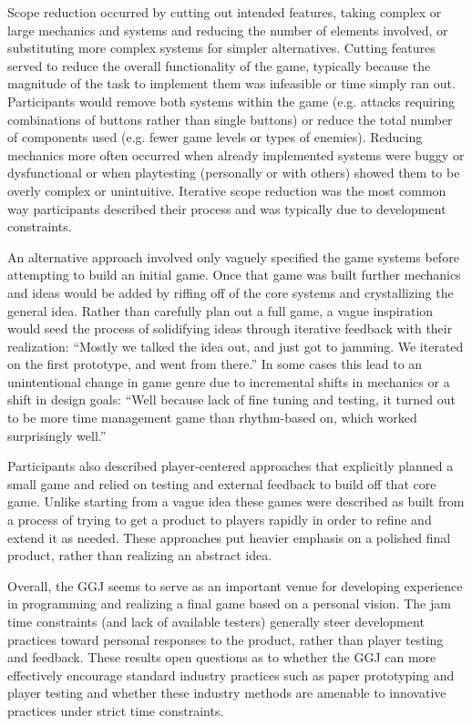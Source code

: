 \documentclass{sig-alternate}
\begin{document}
Scope reduction occurred by cutting out intended features, taking complex or large mechanics and systems and reducing the number of elements involved, or substituting more complex systems for simpler alternatives.
Cutting features served to reduce the overall functionality of the game, typically because the magnitude of the task to implement them was infeasible or time simply ran out. Participants would remove both systems within the game (e.g. attacks requiring combinations of buttons rather than single buttons) or reduce the total number of components used (e.g. fewer game levels or types of enemies).
Reducing mechanics more often occurred when already implemented systems were buggy or dysfunctional or when playtesting (personally or with others) showed them to be overly complex or unintuitive. 
Iterative scope reduction was the most common way participants described their process and was typically due to development constraints.

An alternative approach involved only vaguely specified the game systems before attempting to build an initial game. Once that game was built further mechanics and ideas would be added by riffing off of the core systems and crystallizing the general idea.
Rather than carefully plan out a full game, a vague inspiration would seed the process of solidifying ideas through iterative feedback with their realization: ``Mostly we talked the idea out, and just got to jamming. We iterated on the first prototype, and went from there.''
In some cases this lead to an unintentional change in game genre due to incremental shifts in mechanics or a shift in design goals:
``Well because lack of fine tuning and testing, it turned out to be more time management game than rhythm-based on, which worked surprisingly well.''


Participants also described player-centered approaches that explicitly planned a small game and relied on testing and external feedback to build off that core game. Unlike starting from a vague idea these games were described as built from a process of trying to get a product to players rapidly in order to refine and extend it as needed. These approaches put heavier emphasis on a polished final product, rather than realizing an abstract idea.

Overall, the GGJ seems to serve as an important venue for developing experience in programming and realizing a final game based on a personal vision. The jam time constraints (and lack of available testers) generally steer development practices toward personal responses to the product, rather than player testing and feedback. These results open questions as to whether the GGJ can more effectively encourage standard industry practices such as paper prototyping and player testing and whether these industry methods are amenable to innovative practices under strict time constraints.
\end{document}
